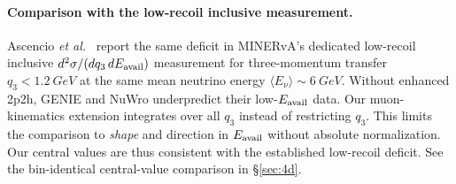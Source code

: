 \paragraph{Comparison with the low-recoil inclusive measurement.} Ascencio \emph{et al.}~\cite{MINERvA:2022incl} report the same deficit in MINERvA's dedicated low-recoil inclusive $d^{2}\sigma/(dq_{3}\,dE_{\mathrm{avail}})$ measurement for three-momentum transfer $q_{3}<\SI{1.2}{GeV}$ at the same mean neutrino energy $\langle E_\nu\rangle\sim\SI{6}{GeV}$. Without enhanced 2p2h, GENIE and NuWro underpredict their low-$E_{\mathrm{avail}}$ data. Our muon-kinematics extension integrates over all $q_3$ instead of restricting $q_3$. This limits the comparison to \emph{shape} and direction in $E_{\mathrm{avail}}$ without absolute normalization. Our central values are thus consistent with the established low-recoil deficit. See the bin-identical central-value comparison in \S\ref{sec:4d}.

